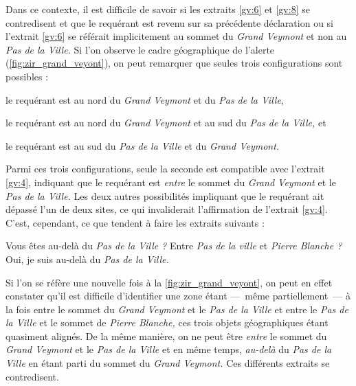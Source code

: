 Dans ce contexte, il est difficile de savoir si les extraits
\ref{gv:6} et \ref{gv:8} se contredisent et que le requérant est
revenu sur sa précédente déclaration ou si l'extrait \ref{gv:6} se
référait implicitement au sommet du \emph{Grand Veymont} et non au
\emph{Pas de la Ville.} Si l'on observe le cadre géographique de
l'alerte (\autoref{fig:zir_grand_veyont}), on peut remarquer que
seules trois configurations sont possibles :
%
\begin{enumerate*}[label=(\arabic*)]
\item le requérant est au nord du \emph{Grand Veymont} et du \emph{Pas
    de la Ville},
\item le requérant est au nord du \emph{Grand Veymont} et au sud du
  \emph{Pas de la Ville,} et
\item le requérant est au sud du \emph{Pas de la Ville} et du
  \emph{Grand Veymont.}
\end{enumerate*}
%
Parmi ces trois configurations, seule la seconde est compatible avec
l'extrait \ref{gv:4}, indiquant que le requérant est \emph{entre} le
sommet du \emph{Grand Veymont} et le \emph{Pas de la Ville.} Les deux
autres possibilités impliquant que le requérant ait dépassé l'un de
deux sites, ce qui invaliderait l'affirmation de l'extrait
\ref{gv:4}. C'est, cependant, ce que tendent à faire les extraits
suivants :
%
\begin{dialogue*}
  \Sec {} Vous êtes au-delà du \emph{Pas de la Ville ?}
   Entre \emph{Pas de la ville} et \emph{Pierre
    Blanche ?}
  \Req {} Oui, je suis au-delà du \emph{Pas de la
    Ville.}
\end{dialogue*}

Si l'on se réfère une nouvelle fois à la
\autoref{fig:zir_grand_veyont}, on peut en effet constater qu'il est
difficile d'identifier une zone étant ---~même partiellement~--- à la
fois entre le sommet du \emph{Grand Veymont} et le \emph{Pas de la
  Ville} et entre le \emph{Pas de la Ville} et le sommet de
\emph{Pierre Blanche,} ces trois objets géographiques étant quasiment
alignés. De la même manière, on ne peut être \emph{entre} le sommet du
\emph{Grand Veymont} et le \emph{Pas de la Ville} et en même temps,
\emph{au-delà} du \emph{Pas de la Ville} en étant parti du sommet du
\emph{Grand Veymont.} Ces différents extraits se contredisent.

